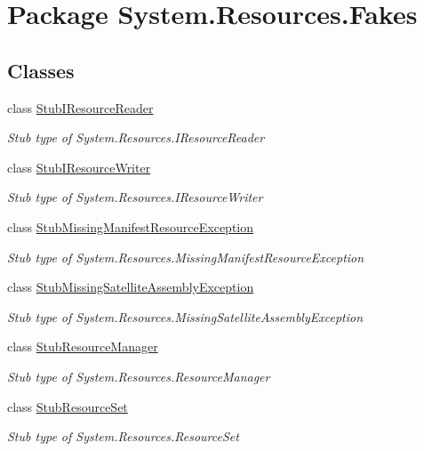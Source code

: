 \hypertarget{namespace_system_1_1_resources_1_1_fakes}{\section{Package System.\-Resources.\-Fakes}
\label{namespace_system_1_1_resources_1_1_fakes}
}
\subsection*{Classes}
\begin{DoxyCompactItemize}
\item 
class \hyperlink{class_system_1_1_resources_1_1_fakes_1_1_stub_i_resource_reader}{Stub\-I\-Resource\-Reader}
\begin{DoxyCompactList}\small\item\em Stub type of System.\-Resources.\-I\-Resource\-Reader\end{DoxyCompactList}\item 
class \hyperlink{class_system_1_1_resources_1_1_fakes_1_1_stub_i_resource_writer}{Stub\-I\-Resource\-Writer}
\begin{DoxyCompactList}\small\item\em Stub type of System.\-Resources.\-I\-Resource\-Writer\end{DoxyCompactList}\item 
class \hyperlink{class_system_1_1_resources_1_1_fakes_1_1_stub_missing_manifest_resource_exception}{Stub\-Missing\-Manifest\-Resource\-Exception}
\begin{DoxyCompactList}\small\item\em Stub type of System.\-Resources.\-Missing\-Manifest\-Resource\-Exception\end{DoxyCompactList}\item 
class \hyperlink{class_system_1_1_resources_1_1_fakes_1_1_stub_missing_satellite_assembly_exception}{Stub\-Missing\-Satellite\-Assembly\-Exception}
\begin{DoxyCompactList}\small\item\em Stub type of System.\-Resources.\-Missing\-Satellite\-Assembly\-Exception\end{DoxyCompactList}\item 
class \hyperlink{class_system_1_1_resources_1_1_fakes_1_1_stub_resource_manager}{Stub\-Resource\-Manager}
\begin{DoxyCompactList}\small\item\em Stub type of System.\-Resources.\-Resource\-Manager\end{DoxyCompactList}\item 
class \hyperlink{class_system_1_1_resources_1_1_fakes_1_1_stub_resource_set}{Stub\-Resource\-Set}
\begin{DoxyCompactList}\small\item\em Stub type of System.\-Resources.\-Resource\-Set\end{DoxyCompactList}\end{DoxyCompactItemize}
